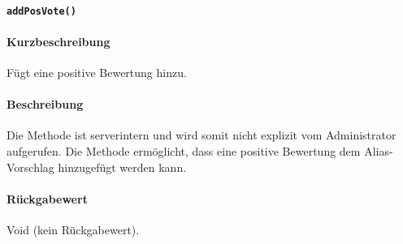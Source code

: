 \paragraph*{\texttt{addPosVote()}}%
\paragraph*{Kurzbeschreibung}
Fügt eine positive Bewertung hinzu.
\paragraph*{Beschreibung}
Die Methode ist serverintern und wird somit nicht explizit vom Administrator aufgerufen.
Die Methode ermöglicht, dass eine positive Bewertung dem Alias-Vorschlag hinzugefügt werden kann.
\paragraph*{Rückgabewert}
Void (kein Rückgabewert).
